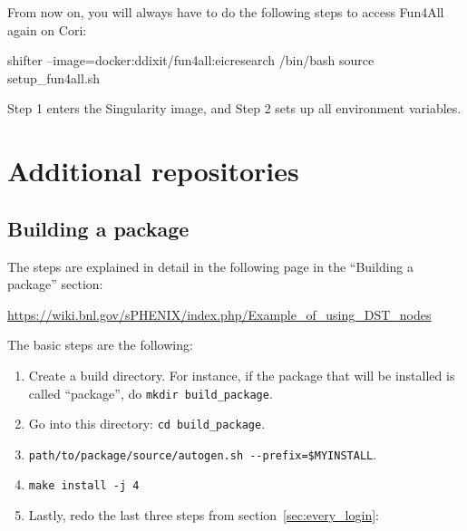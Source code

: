 \documentclass[12pt]{article}
\begin{document}
From now on, you will always have to do the following steps to access Fun4All again on Cori:

\begin{tcolorbox}
\begin{verbnobox}[\scriptsize]
shifter --image=docker:ddixit/fun4all:eicresearch /bin/bash
source setup_fun4all.sh
\end{verbnobox}  
\end{tcolorbox}

Step 1 enters the Singularity image, and Step 2 sets up all environment variables.

\newpage
\section{Additional repositories}

\subsection{Building a package}
\label{sec:build}

The steps are explained in detail in the following page in the ``Building a package'' section:

\href{https://wiki.bnl.gov/sPHENIX/index.php/Example_of_using_DST_nodes}{https://wiki.bnl.gov/sPHENIX/index.php/Example\_of\_using\_DST\_nodes}

The basic steps are the following:

\begin{enumerate}
\item Create a build directory. For instance, if the package that will be installed is called ``package'', do \verb|mkdir build_package|.
\item Go into this directory: \verb|cd build_package|.
\item \verb|path/to/package/source/autogen.sh --prefix=$MYINSTALL|.
\item \verb|make install -j 4|
\item Lastly, redo the last three steps from section~\ref{sec:every_login}:

\begin{tcolorbox}
\end{tcolorbox}

\end{enumerate}
\end{document}
